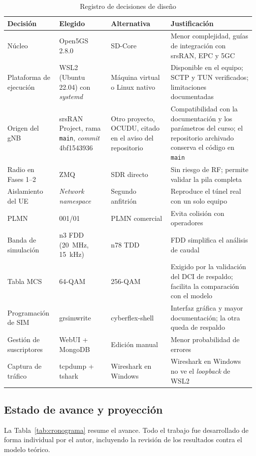 \documentclass[conference]{IEEEtran}
\begin{document}
\begin{table}[!t]
\caption{Registro de decisiones de diseño}
\label{tab:decisiones}
\centering
\footnotesize
\renewcommand{\arraystretch}{1.15}
\begin{tabular}{p{3.0cm}p{3.6cm}p{3.6cm}p{6.8cm}}
\toprule
\textbf{Decisión} & \textbf{Elegido} & \textbf{Alternativa} & \textbf{Justificación} \\
\midrule
Núcleo & Open5GS 2.8.0 & SD-Core & Menor complejidad, guías de integración con srsRAN, EPC y 5GC \\
Plataforma de ejecución & WSL2 (Ubuntu 22.04) con \textit{systemd} & Máquina virtual o Linux nativo & Disponible en el equipo; SCTP y TUN verificados; limitaciones documentadas \\
Origen del gNB & srsRAN Project, rama \texttt{main}, \textit{commit} 4bf1543936 & Otro proyecto, OCUDU, citado en el aviso del repositorio & Compatibilidad con la documentación y los parámetros del curso; el repositorio archivado conserva el código en \texttt{main} \\
Radio en Fases 1--2 & ZMQ & SDR directo & Sin riesgo de RF; permite validar la pila completa \\
Aislamiento del UE & \textit{Network namespace} & Segundo anfitrión & Reproduce el túnel real con un solo equipo \\
PLMN & 001/01 & PLMN comercial & Evita colisión con operadores \\
Banda de simulación & n3 FDD (20~MHz, 15~kHz) & n78 TDD & FDD simplifica el análisis de caudal \\
Tabla MCS & 64-QAM & 256-QAM & Exigido por la validación del DCI de respaldo; facilita la comparación con el modelo \\
Programación de SIM & grsimwrite & cyberflex-shell & Interfaz gráfica y mayor documentación; la otra queda de respaldo \\
Gestión de suscriptores & WebUI + MongoDB & Edición manual & Menor probabilidad de errores \\
Captura de tráfico & tcpdump + tshark & Wireshark en Windows & Wireshark en Windows no ve el \textit{loopback} de WSL2 \\
\bottomrule
\end{tabular}
\end{table}

\subsection{Estado de avance y proyección}
La Tabla~\ref{tab:cronograma} resume el avance. Todo el trabajo fue desarrollado de forma individual por el autor, incluyendo la revisión de los resultados contra el modelo teórico.
\end{document}
